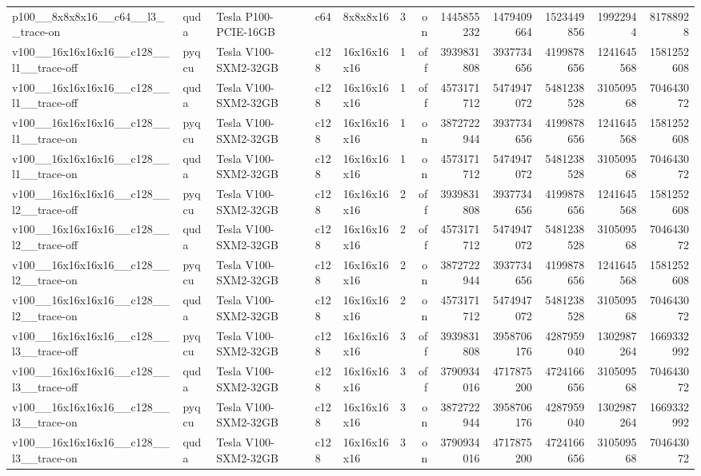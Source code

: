 \begin{table}[htbp]
\begin{tabular}{@{}lllllrrrrrrr@{}}
p100\_\_8x8x8x16\_\_c64\_\_l3\_\_trace-on & quda & Tesla P100-PCIE-16GB & c64 & 8x8x8x16 & 3 & on & 1445855232 & 1479409664 & 1523449856 & 19922944 & 81788928 \\
v100\_\_16x16x16x16\_\_c128\_\_l1\_\_trace-off & pyqcu & Tesla V100-SXM2-32GB & c128 & 16x16x16x16 & 1 & off & 3939831808 & 3937734656 & 4199878656 & 1241645568 & 1581252608 \\
v100\_\_16x16x16x16\_\_c128\_\_l1\_\_trace-off & quda & Tesla V100-SXM2-32GB & c128 & 16x16x16x16 & 1 & off & 4573171712 & 5474947072 & 5481238528 & 310509568 & 704643072 \\
v100\_\_16x16x16x16\_\_c128\_\_l1\_\_trace-on & pyqcu & Tesla V100-SXM2-32GB & c128 & 16x16x16x16 & 1 & on & 3872722944 & 3937734656 & 4199878656 & 1241645568 & 1581252608 \\
v100\_\_16x16x16x16\_\_c128\_\_l1\_\_trace-on & quda & Tesla V100-SXM2-32GB & c128 & 16x16x16x16 & 1 & on & 4573171712 & 5474947072 & 5481238528 & 310509568 & 704643072 \\
v100\_\_16x16x16x16\_\_c128\_\_l2\_\_trace-off & pyqcu & Tesla V100-SXM2-32GB & c128 & 16x16x16x16 & 2 & off & 3939831808 & 3937734656 & 4199878656 & 1241645568 & 1581252608 \\
v100\_\_16x16x16x16\_\_c128\_\_l2\_\_trace-off & quda & Tesla V100-SXM2-32GB & c128 & 16x16x16x16 & 2 & off & 4573171712 & 5474947072 & 5481238528 & 310509568 & 704643072 \\
v100\_\_16x16x16x16\_\_c128\_\_l2\_\_trace-on & pyqcu & Tesla V100-SXM2-32GB & c128 & 16x16x16x16 & 2 & on & 3872722944 & 3937734656 & 4199878656 & 1241645568 & 1581252608 \\
v100\_\_16x16x16x16\_\_c128\_\_l2\_\_trace-on & quda & Tesla V100-SXM2-32GB & c128 & 16x16x16x16 & 2 & on & 4573171712 & 5474947072 & 5481238528 & 310509568 & 704643072 \\
v100\_\_16x16x16x16\_\_c128\_\_l3\_\_trace-off & pyqcu & Tesla V100-SXM2-32GB & c128 & 16x16x16x16 & 3 & off & 3939831808 & 3958706176 & 4287959040 & 1302987264 & 1669332992 \\
v100\_\_16x16x16x16\_\_c128\_\_l3\_\_trace-off & quda & Tesla V100-SXM2-32GB & c128 & 16x16x16x16 & 3 & off & 3790934016 & 4717875200 & 4724166656 & 310509568 & 704643072 \\
v100\_\_16x16x16x16\_\_c128\_\_l3\_\_trace-on & pyqcu & Tesla V100-SXM2-32GB & c128 & 16x16x16x16 & 3 & on & 3872722944 & 3958706176 & 4287959040 & 1302987264 & 1669332992 \\
v100\_\_16x16x16x16\_\_c128\_\_l3\_\_trace-on & quda & Tesla V100-SXM2-32GB & c128 & 16x16x16x16 & 3 & on & 3790934016 & 4717875200 & 4724166656 & 310509568 & 704643072 \\

\end{tabular}
\end{table}
